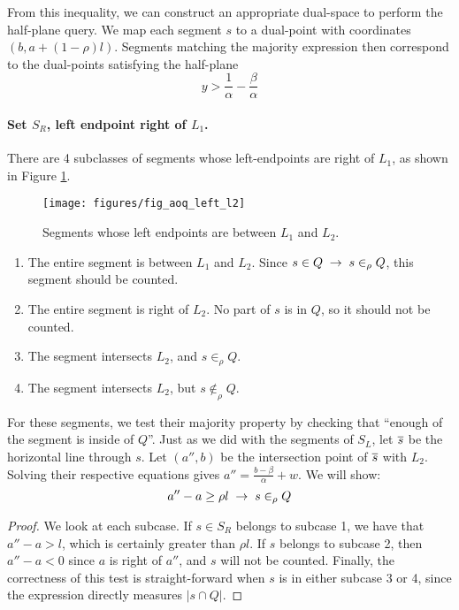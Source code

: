 From this inequality, we can construct an appropriate dual-space to perform the half-plane query. We map each segment $s$ to a dual-point with coordinates $(b, a + (1-\rho)l)$. Segments matching the majority expression then correspond to the dual-points satisfying the half-plane
\[
y > \frac{1}{\alpha} - \frac{\beta}{\alpha}
\]


\paragraph{Set $S_R$, left endpoint right of $L_1$.}
There are 4 subclasses of segments whose left-endpoints are right of $L_1$, as shown in Figure \ref{fig:slabs:one:aoq_left_l2}.

\begin{figure}[t]
\begin{center}
  \texttt{[image: figures/fig\_aoq\_left\_l2]}
  \caption{Segments whose left endpoints are between $L_1$ and $L_2$.}
  \label{fig:slabs:one:aoq_left_l2}
\end{center}
\end{figure}


\begin{enumerate}
 \item The entire segment is between $L_1$ and $L_2$. Since $s \in Q \;\rightarrow\; s \in_\rho Q$, this segment should be counted.

 \item The entire segment is right of $L_2$. No part of $s$ is in $Q$, so it should not be counted.

 \item The segment intersects $L_2$, and $s \in_\rho Q$.

 \item The segment intersects $L_2$, but $s \not \in_\rho Q$.

\end{enumerate}

For these segments, we test their majority property by checking that ``enough of the segment is inside of $Q$''.  Just as we did with the segments of $S_L$, let $\overline{s}$ be the horizontal line through $s$.  Let $(a'', b)$ be the intersection point of $\overline{s}$ with $L_2$. Solving their respective equations gives $a'' = \frac{b - \beta}{\alpha} + w$.  We will show:
\[
a'' - a \geq \rho l \;\rightarrow\; s \in_\rho Q
\]

\begin{proof}
We look at each subcase. If $s \in S_R$ belongs to subcase 1, we have that $a'' - a > l$, which is certainly greater than $\rho l$. If $s$ belongs to subcase 2, then $a'' - a < 0$ since $a$ is right of $a''$, and $s$ will not be counted.  Finally, the correctness of this test is straight-forward when $s$ is in either subcase 3 or 4, since the expression directly measures $|s \cap Q|$.
\end{proof}

